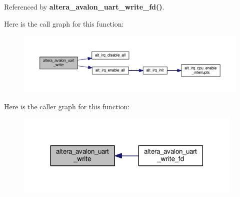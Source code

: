 Referenced by {\bf altera\+\_\+avalon\+\_\+uart\+\_\+write\+\_\+fd()}.



Here is the call graph for this function\+:
\nopagebreak
\begin{figure}[H]
\begin{center}
\leavevmode
\includegraphics[width=350pt]{dc/d33/altera__avalon__uart__write_8c_ad45290e665fecada6a8ed1dd102135a9_cgraph}
\end{center}
\end{figure}




Here is the caller graph for this function\+:
\nopagebreak
\begin{figure}[H]
\begin{center}
\leavevmode
\includegraphics[width=308pt]{dc/d33/altera__avalon__uart__write_8c_ad45290e665fecada6a8ed1dd102135a9_icgraph}
\end{center}
\end{figure}


